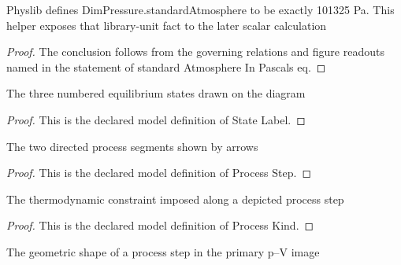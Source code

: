 \begin{theorem}
  \label{thm:physics:phyx-mini-0411:phyxminiproblems-problemphyxmini0411-standardatmosphereinpascals-eq}
  Physlib defines DimPressure.standardAtmosphere to be exactly 101325 Pa. This helper exposes that library-unit fact to the later scalar calculation
\end{theorem}
\begin{proof}
  The conclusion follows from the governing relations and figure readouts named in the statement of standard Atmosphere In Pascals eq.
\end{proof}
\begin{definition}
  \label{def:physics:phyx-mini-0411:phyxminiproblems-problemphyxmini0411-statelabel}
  The three numbered equilibrium states drawn on the diagram
\end{definition}
\begin{proof}
  This is the declared model definition of State Label.
\end{proof}
\begin{definition}
  \label{def:physics:phyx-mini-0411:phyxminiproblems-problemphyxmini0411-processstep}
  The two directed process segments shown by arrows
\end{definition}
\begin{proof}
  This is the declared model definition of Process Step.
\end{proof}
\begin{definition}
  \label{def:physics:phyx-mini-0411:phyxminiproblems-problemphyxmini0411-processkind}
  The thermodynamic constraint imposed along a depicted process step
\end{definition}
\begin{proof}
  This is the declared model definition of Process Kind.
\end{proof}
\begin{definition}
  \label{def:physics:phyx-mini-0411:phyxminiproblems-problemphyxmini0411-pathgeometry}
  The geometric shape of a process step in the primary p--V image
\end{definition}
